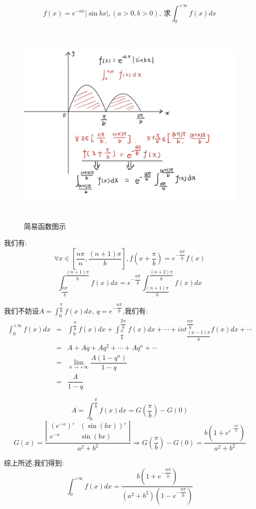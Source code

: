 \begin{anymark}[思考]
	$$f(x)=e^{-ax}|\sin bx|,(a>0,b>0),\ \text{求}\int_{0}^{+\infty}f(x)dx$$
\begin{figure}[H]
	\centering
	\includegraphics[width=15cm,height=10cm]{"figure/Summary/伪周期问题.jpg"}
	\caption{简易函数图示}
\end{figure} 	
	我们有:  
	$$\forall x\in[\dfrac{n\pi}{n},\dfrac{(n+1)\pi}{b}], f(x+\dfrac{\pi}{b})=e^{-\dfrac{a\pi}{b}}f(x)$$
	$$\int_{\dfrac{n\pi}{b}}^{\dfrac{(n+1)\pi}{b}}f(x)dx=e^{-\dfrac{a\pi}{b}}\int_{\dfrac{(n+1)\pi}{b}}^{\dfrac{(n+2)\pi}{b}}f(x)dx$$
	
	我们不妨设$A=\int_{0}^{\dfrac{\pi}{b}}f(x)dx,\ q=e^{-\dfrac{a\pi}{b}}$,我们有:  
	\begin{eqnarray*}
		\int_{0}^{+\infty}f(x)dx&=&\int_{0}^{\dfrac{\pi}{b}}f(x)dx+\int_{\dfrac{\pi}{b}}^{\dfrac{2\pi}{b}}f(x)dx+\cdots+int_{\dfrac{(n-1)\pi}{b}}^{\dfrac{n\pi}{b}}f(x)dx+\cdots\\
		&=&A+Aq+Aq^2+\cdots+Aq^{n}+\cdots\\
		&=&\lim\limits_{n\rightarrow+\infty}\dfrac{A(1-q^n)}{1-q}\\
		&=&\dfrac{A}{1-q}
	\end{eqnarray*}

	$$A=\int_{0}^{\dfrac{\pi}{b}}f(x)dx=G(\dfrac{\pi}{b})-G(0)$$
	$$G(x)=\dfrac{\left| \begin{matrix}
			(e^{-a})'&(\sin(bx))'\\e^{-a}&\sin(bx)
		\end{matrix}\right| }{a^2+b^2}\Rightarrow G(\dfrac{\pi}{b})-G(0)=\dfrac{b(1+e^{e^{-\dfrac{a\pi}{b}}})}{a^2+b^2}$$
	
	综上所述,我们得到:  
	$$\int_{0}^{+\infty}f(x)dx=\dfrac{b(1+e^{-\dfrac{a\pi}{b}})}{(a^2+b^2)(1-e^{-\dfrac{a\pi}{b}})}$$
\end{anymark}

